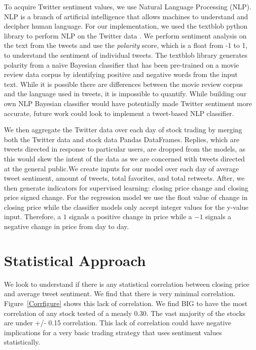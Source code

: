\documentclass[../thesis.tex]{subfiles}
\begin{document}
To acquire Twitter sentiment values, we use Natural Language Processing (NLP). NLP is a branch of artificial intelligence that allows machines to understand and decipher human language. For our implementation, we used the textblob python library to perform NLP on the Twitter data \cite{Loria2018}. We perform sentiment analysis on the text from the tweets and use the \textit{polarity} score, which is a float from -1 to 1, to understand the sentiment of individual tweets. The textblob library generates polarity from a na\"{i}ve Bayesian classifier that has been pre-trained on a movie review data corpus by identifying positive and negative words from the input text. While it is possible there are differences between the movie review corpus and the language used in tweets, it is impossible to quantify. While building our own NLP Bayesian classifier would have potentially made Twitter sentiment more accurate, future work could look to implement a tweet-based NLP classifier. 

We then aggregate the Twitter data over each day of stock trading by merging both the Twitter data and stock data Pandas DataFrames. Replies, which are tweets directed in response to particular users, are dropped from the models, as this would skew the intent of the data as we are concerned with tweets directed at the general public.We create inputs for our model over each day of average tweet sentiment, amount of tweets, total favorites, and total retweets. After, we then generate indicators for supervised learning: closing price change and closing price signed change. For the regression model we use the float value of change in closing price while the classifier models only accept integer values for the y-value input. Therefore, a $1$ signals a positive change in price while a $-1$ signals a negative change in price from day to day.  

\section{Statistical Approach}
We look to understand if there is any statistical correlation between closing price and average tweet sentiment. We find that there is very minimal correlation. Figure~\ref{Corrfigure} shows this lack of correlation. We find BIG to have the most correlation of any stock tested of a measly 0.30. The vast majority of the stocks are under +/- 0.15 correlation. This lack of correlation could have negative implications for a very basic trading strategy that uses sentiment values statistically.
\end{document}
